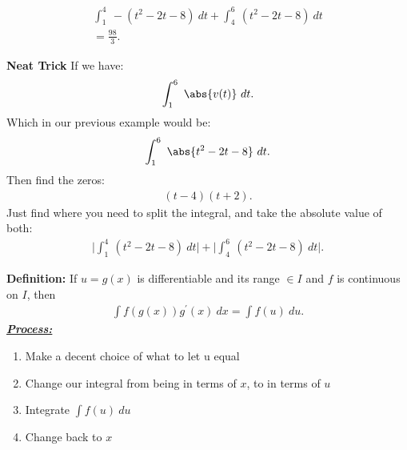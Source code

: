 \documentclass{report}
\begin{document}
  \begin{align*}
    \int_{1}^{4}\ -(t^{2}-2t-8)\ dt + \int_{4}^{6}\ (t^{2}-2t-8)\ dt \\
    \boxed{=\frac{98}{3}}
  .\end{align*}

  \bigbreak \noindent 
  \begin{mdframed}
    \textbf{Neat Trick}
    \bigbreak \noindent 
    If we have:
    \begin{align*}
      \int_{1}^{6}\ \abs{v(t)}\ dt
    .\end{align*}
    \bigbreak \noindent \bigbreak \noindent
    Which in our previous example would be:
    \begin{align*}
      \int_{1}^{6}\ \abs{t^{2}-2t-8}\ dt
    .\end{align*}
    \bigbreak \noindent \bigbreak \noindent
    Then find the zeros:
    \begin{align*}
      (t-4)(t+2)
    .\end{align*}
    \bigbreak \noindent \bigbreak \noindent
    Just find where you need to split the integral, and take the absolute value of both:
    \begin{align*}
      \bigg|\int_{1}^{4}\ (t^{2}-2t-8)\ dt\bigg| + \bigg|\int_{4}^{6}\ (t^{2}-2t-8)\ dt\bigg|
    .\end{align*}
  \end{mdframed}


  \bigbreak \noindent 
  \begin{mdframed}
    \textbf{Definition:}
    \bigbreak \noindent \bigbreak \noindent
    If $u=g(x)$ is differentiable and its range $\in I $ and $f $ is continuous on $I$, then
    \begin{align*}
      \int f(g(x))g^{\prime}(x)\ dx = \int f(u)\ du
    .\end{align*}
    \bigbreak \noindent \bigbreak \noindent
    \textbf{\textit{\underline{Process:}}}
    \begin{enumerate}
      \item Make a decent choice of what to let u equal
      \item Change our integral from being in terms of $x$, to in terms of $u$
      \item Integrate $\int f(u)\ du $
      \item Change back to $x$
    \end{enumerate}
    \bigbreak \noindent \bigbreak \noindent


    \bigbreak \noindent 
  \end{mdframed}
\end{document}

